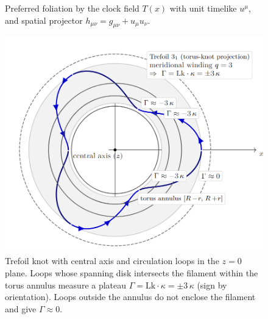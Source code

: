 \documentclass[11pt]{article}
\begin{document}
    \begin{figure}[t]
        \centering
        \caption{Preferred foliation by the clock field $T(x)$ with unit timelike $u^\mu$, and spatial projector $h_{\mu\nu}=g_{\mu\nu}+u_\mu u_\nu$.}\label{fig:foliation}
    \end{figure}


    \begin{figure}[htbp]
      \centering
      \includegraphics[width=0.7\linewidth]{figures/trefoil_axis_plateu}
            \caption{Trefoil knot with central axis and circulation loops in the \(z{=}0\) plane.
            Loops whose spanning disk intersects the filament within the torus annulus measure a plateau \(\Gamma=\mathrm{Lk}\cdot\kappa=\pm 3\,\kappa\) (sign by orientation).
            Loops outside the annulus do not enclose the filament and give \(\Gamma\approx 0\).}
            \label{fig:trefoil_axis_plateau_clean}
    \end{figure}
\end{document}
